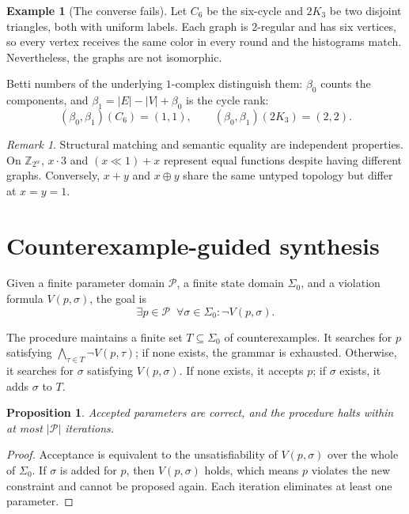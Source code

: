 \documentclass[11pt]{article}
\newtheorem{proposition}[theorem]{Proposition}
\theoremstyle{definition}
\newtheorem{example}[theorem]{Example}
\theoremstyle{remark}
\newtheorem{remark}[theorem]{Remark}
\newcommand{\Z}{\mathbb{Z}}
\begin{document}
\begin{example}[The converse fails]
Let $C_6$ be the six-cycle and $2K_3$ be two disjoint triangles, both with uniform labels. Each graph is $2$-regular and has six vertices, so every vertex receives the same color in every round and the histograms match. Nevertheless, the graphs are not isomorphic.

Betti numbers of the underlying $1$-complex distinguish them: $\beta_0$ counts the components, and $\beta_1 = |E| - |V| + \beta_0$ is the cycle rank:
\[
  (\beta_0, \beta_1)(C_6) = (1, 1), \qquad (\beta_0, \beta_1)(2K_3) = (2, 2).
\]
\end{example}

\begin{remark}
Structural matching and semantic equality are independent properties. On $\Z_{2^w}$, $x \cdot 3$ and $(x \ll 1) + x$ represent equal functions despite having different graphs. Conversely, $x + y$ and $x \oplus y$ share the same untyped topology but differ at $x = y = 1$.
\end{remark}

\section{Counterexample-guided synthesis}

Given a finite parameter domain $\mathcal{P}$, a finite state domain $\Sigma_0$, and a violation formula $V(p, \sigma)$, the goal is
\[
  \exists p \in \mathcal{P} \;\; \forall \sigma \in \Sigma_0 : \neg V(p, \sigma).
\]

The procedure maintains a finite set $T \subseteq \Sigma_0$ of counterexamples. It searches for $p$ satisfying $\bigwedge_{\tau \in T} \neg V(p, \tau)$; if none exists, the grammar is exhausted. Otherwise, it searches for $\sigma$ satisfying $V(p, \sigma)$. If none exists, it accepts $p$; if $\sigma$ exists, it adds $\sigma$ to $T$.

\begin{proposition}
Accepted parameters are correct, and the procedure halts within at most $|\mathcal{P}|$ iterations.
\end{proposition}

\begin{proof}
Acceptance is equivalent to the unsatisfiability of $V(p, \sigma)$ over the whole of $\Sigma_0$. If $\sigma$ is added for $p$, then $V(p, \sigma)$ holds, which means $p$ violates the new constraint and cannot be proposed again. Each iteration eliminates at least one parameter.
\end{proof}
\end{document}

